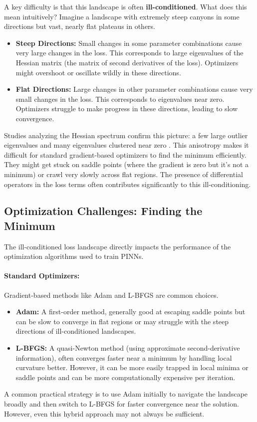 A key difficulty is that this landscape is often \textbf{ill-conditioned}. What does this mean intuitively? Imagine a landscape with extremely steep canyons in some directions but vast, nearly flat plateaus in others.
\begin{itemize}
    \item \textbf{Steep Directions:} Small changes in some parameter combinations cause very large changes in the loss. This corresponds to large eigenvalues of the Hessian matrix (the matrix of second derivatives of the loss). Optimizers might overshoot or oscillate wildly in these directions.
    \item \textbf{Flat Directions:} Large changes in other parameter combinations cause very small changes in the loss. This corresponds to eigenvalues near zero. Optimizers struggle to make progress in these directions, leading to slow convergence.
\end{itemize}
Studies analyzing the Hessian spectrum confirm this picture: a few large outlier eigenvalues and many eigenvalues clustered near zero \cite{krishnapriyan2021characterizing, rathore2024challenges}. This anisotropy makes it difficult for standard gradient-based optimizers to find the minimum efficiently. They might get stuck on saddle points (where the gradient is zero but it's not a minimum) or crawl very slowly across flat regions. The presence of differential operators in the loss terms often contributes significantly to this ill-conditioning.

\subsection{Optimization Challenges: Finding the Minimum}

The ill-conditioned loss landscape directly impacts the performance of the optimization algorithms used to train PINNs.

\paragraph{Standard Optimizers:}
Gradient-based methods like Adam and L-BFGS are common choices.
\begin{itemize}
    \item \textbf{Adam:} A first-order method, generally good at escaping saddle points but can be slow to converge in flat regions or may struggle with the steep directions of ill-conditioned landscapes.
    \item \textbf{L-BFGS:} A quasi-Newton method (using approximate second-derivative information), often converges faster near a minimum by handling local curvature better. However, it can be more easily trapped in local minima or saddle points and can be more computationally expensive per iteration.
\end{itemize}
A common practical strategy is to use Adam initially to navigate the landscape broadly and then switch to L-BFGS for faster convergence near the solution. However, even this hybrid approach may not always be sufficient.

